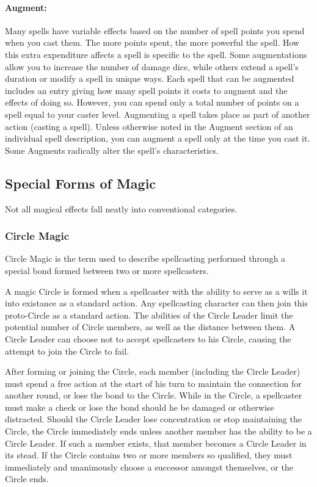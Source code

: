 \paragraph{Augment:} Many spells have variable effects based on the number of spell points you spend when you cast them. The more points spent, the more powerful the spell. How this extra expenditure affects a spell is specific to the spell. Some augmentations allow you to increase the number of damage dice, while others extend a spell's duration or modify a spell in unique ways. Each spell that can be augmented includes an entry giving how many spell points it costs to augment and the effects of doing so. However, you can spend only a total number of points on a spell equal to your caster level.
Augmenting a spell takes place as part of another action (casting a spell). Unless otherwise noted in the Augment section of an individual spell description, you can augment a spell only at the time you cast it. Some Augments radically alter the spell's characteristics.
\subsection{Special Forms of Magic}
Not all magical effects fall neatly into conventional categories.
\subsubsection{Circle Magic}
\label{sec:CircleMagic}
Circle Magic is the term used to describe spellcasting performed through a special bond formed between two or more spellcasters.

A magic Circle is formed when a spellcaster with the ability to serve as a  wills it into existance as a standard action. Any spellcasting character can then join this proto-Circle as a standard action. The abilities of the Circle Leader limit the potential number of Circle members, as well as the distance between them. A Circle Leader can choose not to accept spellcasters to his Circle, causing the attempt to join the Circle to fail.

After forming or joining the Circle, each member (including the Circle Leader) must spend a free action at the start of his turn to maintain the connection for another round, or lose the bond to the Circle. While in the Circle, a spellcaster must make a  check or lose the bond should he be damaged or otherwise distracted.
Should the Circle Leader lose concentration or stop maintaining the Circle, the Circle immediately ends unless another member has the ability to be a Circle Leader. If such a member exists, that member becomes a Circle Leader in its stead. If the Circle contains two or more members so qualified, they must immediately and unanimously choose a successor amongst themselves, or the Circle ends.

